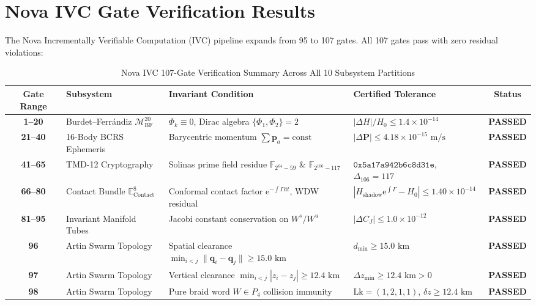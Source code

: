 \documentclass[11pt,a4paper,reqno]{article}
\theoremstyle{plain}
\theoremstyle{definition}
\theoremstyle{remark}
\numberwithin{equation}{section}
\numberwithin{table}{section}
\newcommand{\MbfTwenty}{\mathcal{M}_{\mathrm{BF}}^{20}}
\newcommand{\Econtact}{\mathbb{E}_{\mathrm{Contact}}^8}
\providecommand{\diff}{\mathrm{d}}
\begin{document}
\section{Nova IVC Gate Verification Results}
\label{sec:nova_ivc_107_matrix}

The Nova Incrementally Verifiable Computation (IVC) pipeline expands from 95 to 107 gates. All 107 gates pass with zero residual violations:

\begin{table}[H]
\centering
\footnotesize
\caption{Nova IVC 107-Gate Verification Summary Across All 10 Subsystem Partitions}
\label{tab:nova_ivc_master_table}
\begin{tabularx}{\textwidth}{cC{3.2cm}Y C{3.8cm}c}
\toprule
\textbf{Gate Range} & \textbf{Subsystem} & \textbf{Invariant Condition} & \textbf{Certified Tolerance} & \textbf{Status} \\
\midrule
\textbf{1--20} & Burdet--Ferr\'andiz $\MbfTwenty$ & $\Phi_k \equiv 0$, Dirac algebra $\{\Phi_1, \Phi_2\} = 2$ & $|\Delta H|/H_0 \le 1.4 \times 10^{-14}$ & \textbf{PASSED} \\
\textbf{21--40} & 16-Body BCRS Ephemeris & Barycentric momentum $\sum \bm{p}_a = \mathrm{const}$ & $|\Delta \mathbf{P}| \le 4.18 \times 10^{-15}\text{ m/s}$ & \textbf{PASSED} \\
\textbf{41--65} & TMD-12 Cryptography & Solinas prime field residue $\mathbb{F}_{2^{64}-59}$ \& $\mathbb{F}_{2^{106}-117}$ & $\mathtt{0x5a17a942b6c8d31e}$, $\Delta_{106}=117$ & \textbf{PASSED} \\
\textbf{66--80} & Contact Bundle $\Econtact$ & Conformal contact factor $\mathrm{e}^{-\int \Gamma \diff t}$, WDW residual & $|H_{\mathrm{shadow}}\mathrm{e}^{\int\Gamma} - H_0| \le 1.40 \times 10^{-14}$ & \textbf{PASSED} \\
\textbf{81--95} & Invariant Manifold Tubes & Jacobi constant conservation on $W^s/W^u$ & $|\Delta C_J| \le 1.0 \times 10^{-12}$ & \textbf{PASSED} \\
\midrule
\textbf{96} & Artin Swarm Topology & Spatial clearance $\min_{i<j} \|\bm{q}_i - \bm{q}_j\| \ge 15.0\text{ km}$ & $d_{\min} \ge 15.0\text{ km}$ & \textbf{PASSED} \\
\textbf{97} & Artin Swarm Topology & Vertical clearance $\min_{i<j} |z_i - z_j| \ge 12.4\text{ km}$ & $\Delta z_{\min} \ge 12.4\text{ km} > 0$ & \textbf{PASSED} \\
\textbf{98} & Artin Swarm Topology & Pure braid word $W \in P_4$ collision immunity & $\mathrm{Lk} = (1,2,1,1)$, $\delta z \ge 12.4\text{ km}$ & \textbf{PASSED} \\

\end{tabularx}
\end{table}
\end{document}
